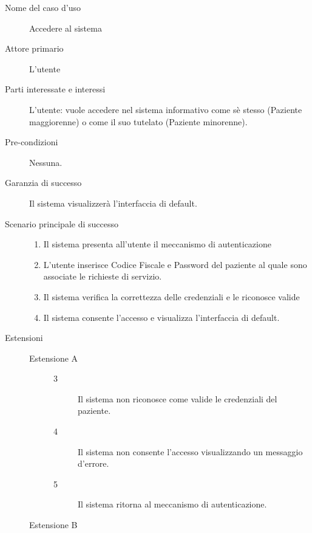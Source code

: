 \begin{description}
\item[Nome del caso d'uso]
       	Accedere al sistema

\item[Attore primario]
        L'utente

\item[Parti interessate e interessi]
        L'utente: vuole accedere nel sistema informativo come sè stesso (Paziente
        maggiorenne) o come il suo tutelato (Paziente minorenne).

\item[Pre-condizioni]
	Nessuna.

\item[Garanzia di successo]
        Il sistema visualizzerà l'interfaccia di default.

\item[Scenario principale di successo]
\begin{enumerate}
\item Il sistema presenta all'utente il meccanismo di autenticazione
\item L'utente inserisce Codice Fiscale e Password del paziente al quale sono
	associate le richieste di servizio.
\item Il sistema verifica la correttezza delle credenziali e le riconosce valide
\item Il sistema consente l'accesso e visualizza l'interfaccia di default.
\end{enumerate}

\item[Estensioni]
\begin{description}
	\item[Estensione A]
	\medskip
	
	\begin{description}
	\item[3]
	Il sistema non riconosce come valide le credenziali del paziente.
	\item[4]
	Il sistema non consente l'accesso visualizzando un messaggio d'errore.
	\item[5]
	Il sistema ritorna al meccanismo di autenticazione.
	\end{description}
	
\end{description}

\begin{description}
	\item[Estensione B]
	\medskip
	

\end{description}
\end{description}
